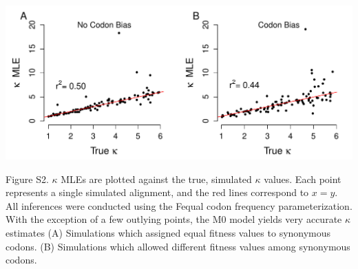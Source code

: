 \documentclass{pnastwo}
\begin{document}
\bigskip
\bigskip
\bigskip
\bigskip


\centerline{\includegraphics[width=5.5in]{figures/SI/kappa_regressions.pdf}}
\noindent Figure S2. $\kappa$ MLEs are plotted against the true, simulated $\kappa$ values. Each point represents a single simulated alignment, and the red lines correspond to $x=y$. All inferences were conducted using the Fequal codon frequency parameterization. With the exception of a few outlying points, the M0 model yields very accurate $\kappa$ estimates (A) Simulations which assigned equal fitness values to synonymous codons. (B) Simulations which allowed different fitness values among synonymous codons. 

\clearpage
\newpage
\end{document}
